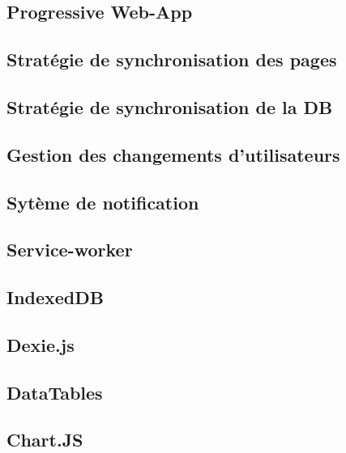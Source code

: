 \documentclass{EPL-master-thesis-covers-FR}
\begin{document}
			\subsection*{Progressive Web-App}
				
			\subsection{Stratégie de synchronisation des pages}			
			
			\subsection{Stratégie de synchronisation de la DB}
			
			
			\subsection{Gestion des changements d'utilisateurs}		
			
			
			\subsection{Sytème de notification}	
						

			\subsection*{Service-worker}

		
			\subsection*{IndexedDB}

					

			\subsection*{Dexie.js}
				

			\subsection*{DataTables}

			

			\subsection*{Chart.JS}
				
				
\end{document}
